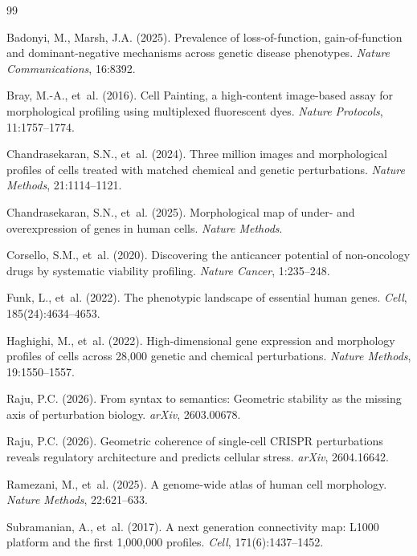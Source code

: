 \documentclass[11pt]{article}
\begin{document}
\begin{thebibliography}{99}

Badonyi, M., Marsh, J.A. (2025).
Prevalence of loss-of-function, gain-of-function and dominant-negative mechanisms across genetic disease phenotypes.
\textit{Nature Communications}, 16:8392.

Bray, M.-A., et~al. (2016).
Cell Painting, a high-content image-based assay for morphological profiling using multiplexed fluorescent dyes.
\textit{Nature Protocols}, 11:1757--1774.

Chandrasekaran, S.N., et~al. (2024).
Three million images and morphological profiles of cells treated with matched chemical and genetic perturbations.
\textit{Nature Methods}, 21:1114--1121.

Chandrasekaran, S.N., et~al. (2025).
Morphological map of under- and overexpression of genes in human cells.
\textit{Nature Methods}.

Corsello, S.M., et~al. (2020).
Discovering the anticancer potential of non-oncology drugs by systematic viability profiling.
\textit{Nature Cancer}, 1:235--248.

Funk, L., et~al. (2022).
The phenotypic landscape of essential human genes.
\textit{Cell}, 185(24):4634--4653.

Haghighi, M., et~al. (2022).
High-dimensional gene expression and morphology profiles of cells across 28,000 genetic and chemical perturbations.
\textit{Nature Methods}, 19:1550--1557.

Raju, P.C. (2026).
From syntax to semantics: Geometric stability as the missing axis of perturbation biology.
\textit{arXiv}, 2603.00678.

Raju, P.C. (2026).
Geometric coherence of single-cell CRISPR perturbations reveals regulatory architecture and predicts cellular stress.
\textit{arXiv}, 2604.16642.

Ramezani, M., et~al. (2025).
A genome-wide atlas of human cell morphology.
\textit{Nature Methods}, 22:621--633.

Subramanian, A., et~al. (2017).
A next generation connectivity map: L1000 platform and the first 1,000,000 profiles.
\textit{Cell}, 171(6):1437--1452.


\end{thebibliography}
\end{document}
